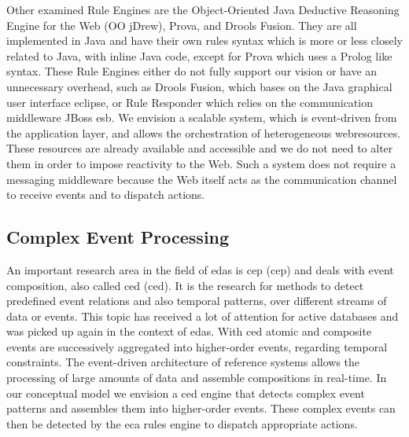 Other examined Rule Engines are the \textrm{Object-Oriented Java Deductive Reasoning Engine for the Web} (\textrm{OO jDrew}), \textrm{Prova}, and \textrm{Drools Fusion}.
They are all implemented in \textrm{Java} and have their own rules syntax which is more or less closely related to \textrm{Java}, with inline \textrm{Java} code, except for \textrm{Prova} which uses a \textrm{Prolog} like syntax.
These Rule Engines either do not fully support our vision or have an unnecessary overhead, such as \textrm{Drools Fusion}, which bases on the Java graphical user interface \textrm{eclipse}, or \textrm{Rule Responder} which relies on the communication middleware \textrm{JBoss \acrshort{esb}}.
We envision a scalable system, which is event-driven from the application layer, and allows the orchestration of heterogeneous \textrm{\glspl{webresource}}.
These resources are already available and accessible and we do not need to alter them in order to impose reactivity to the Web.
Such a system does not require a messaging middleware because the Web itself acts as the communication channel to receive events and to dispatch actions.


\subsection{Complex Event Processing}
An important research area in the field of \textrm{\acrlong{eda}s} is \textrm{\acrlong{cep} (\acrshort{cep})}\cite{anicic2010arlfcepar} and deals with event composition, also called \textrm{\acrlong{ced} (\acrshort{ced})}\cite{akdere2008plan}\cite{2004_1265833}.
It is the research for methods to detect predefined event relations and also temporal patterns, over different streams of data or events.
This topic has received a lot of attention for active databases\cite{Adaikkalavan2007}\cite{Gehani92compositeevent}\cite{Zimmer99onthe} and was picked up again in the context of \textrm{\acrlong{eda}s}.
With \textrm{\acrshort{ced}} atomic and composite events are successively aggregated into higher-order events, regarding temporal constraints.
The event-driven architecture of reference systems allows the processing of large amounts of data and assemble compositions in real-time.
In our conceptual model we envision a \textrm{\acrshort{ced}} engine that detects complex event patterns and assembles them into higher-order events.
These complex events can then be detected by the \textrm{\acrshort{eca}} rules engine to dispatch appropriate actions.
